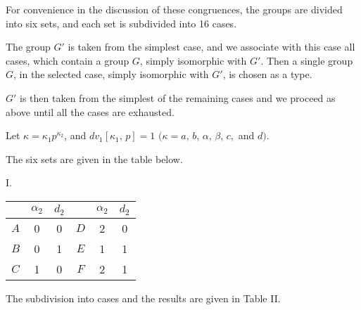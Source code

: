 \documentclass[oneside]{article}
\begin{document}
For convenience in the discussion of these congruences, the groups are
divided into six sets, and each set is subdivided into 16 cases.

The group $G'$ is taken from the simplest case, and we associate with
this case all cases, which contain a group $G$, simply isomorphic with
$G'$. Then a single group $G$, in the selected case, simply isomorphic
with $G'$, is chosen as a type.

$G'$ is then taken from the simplest of the remaining cases and we proceed
as above until all the cases are exhausted.

Let $\kappa = \kappa_1 p^{\kappa_2}$, and $dv_1[\kappa_1 ,\, p] = 1$
$(\kappa = a,\, b,\, \alpha ,\, \beta ,\, c,$ and $d)$.

The six sets are given in the table below.

\begin{center}
\large I. \normalsize

\smallskip
\begin{tabular}{|c|c|c||c|c|c|}
\hline
   &$\alpha_2$&$d_2$&   &$\alpha_2$&$d_2$ \\ \hline
$A$&     0    &  0  &$D$&     2    &  0   \\ \hline
$B$&     0    &  1  &$E$&     1    &  1   \\ \hline
$C$&     1    &  0  &$F$&     2    &  1   \\ \hline
\end{tabular}
\end{center}

\medskip
The subdivision into cases and the results are given in Table II.
\end{document}
